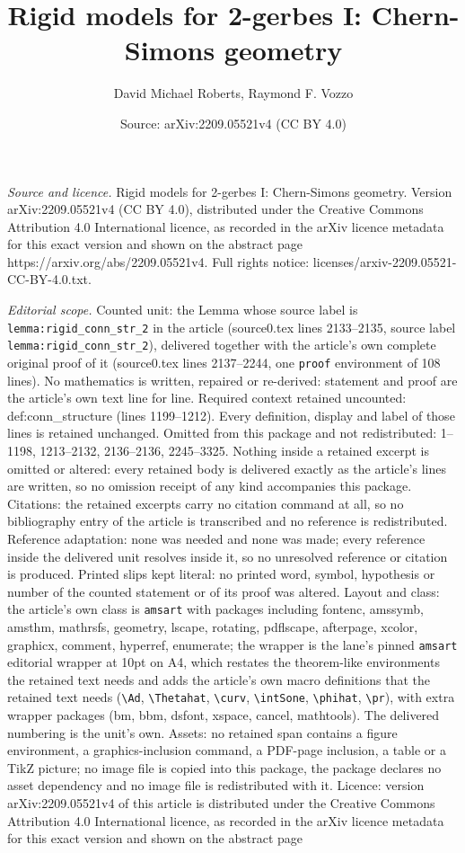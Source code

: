 \documentclass[10pt,a4paper]{amsart}
\title[Rigid models for 2-gerbes I: Chern-Simons geometry]{Rigid models for 2-gerbes I: Chern-Simons geometry}
\author{David Michael Roberts, Raymond F. Vozzo}
\date{Source: arXiv:2209.05521v4 (CC BY 4.0)}
\begin{document}
\maketitle

\noindent\emph{Source and licence.} Rigid models for 2-gerbes I: Chern-Simons geometry. Version arXiv:2209.05521v4 (CC BY 4.0), distributed under the Creative Commons Attribution 4.0 International licence, as recorded in the arXiv licence metadata for this exact version and shown on the abstract page https://arxiv.org/abs/2209.05521v4. Full rights notice: licenses/arxiv-2209.05521-CC-BY-4.0.txt.\par\smallskip

\noindent\textit{Editorial scope.} Counted unit: the Lemma whose source label is \texttt{lemma:rigid\_conn\_str\_2} in the article (source0.tex lines 2133--2135, source label \texttt{lemma:rigid\_conn\_str\_2}), delivered together with the article's own complete original proof of it (source0.tex lines 2137--2244, one \texttt{proof} environment of 108 lines). No mathematics is written, repaired or re-derived: statement and proof are the article's own text line for line. Required context retained uncounted: def:conn\_structure (lines 1199--1212). Every definition, display and label of those lines is retained unchanged. Omitted from this package and not redistributed: 1--1198, 1213--2132, 2136--2136, 2245--3325. Nothing inside a retained excerpt is omitted or altered: every retained body is delivered exactly as the article's lines are written, so no omission receipt of any kind accompanies this package. Citations: the retained excerpts carry no citation command at all, so no bibliography entry of the article is transcribed and no reference is redistributed. Reference adaptation: none was needed and none was made; every reference inside the delivered unit resolves inside it, so no unresolved reference or citation is produced. Printed slips kept literal: no printed word, symbol, hypothesis or number of the counted statement or of its proof was altered. Layout and class: the article's own class is \texttt{amsart} with packages including fontenc, amssymb, amsthm, mathrsfs, geometry, lscape, rotating, pdflscape, afterpage, xcolor, graphicx, comment, hyperref, enumerate; the wrapper is the lane's pinned \texttt{amsart} editorial wrapper at 10pt on A4, which restates the theorem-like environments the retained text needs and adds the article's own macro definitions that the retained text needs (\texttt{\textbackslash Ad}, \texttt{\textbackslash Thetahat}, \texttt{\textbackslash curv}, \texttt{\textbackslash intSone}, \texttt{\textbackslash phihat}, \texttt{\textbackslash pr}), with extra wrapper packages (bm, bbm, dsfont, xspace, cancel, mathtools). The delivered numbering is the unit's own. Assets: no retained span contains a figure environment, a graphics-inclusion command, a PDF-page inclusion, a table or a TikZ picture; no image file is copied into this package, the package declares no asset dependency and no image file is redistributed with it. Licence: version arXiv:2209.05521v4 of this article is distributed under the Creative Commons Attribution 4.0 International licence, as recorded in the arXiv licence metadata for this exact version and shown on the abstract page 
\end{document}
